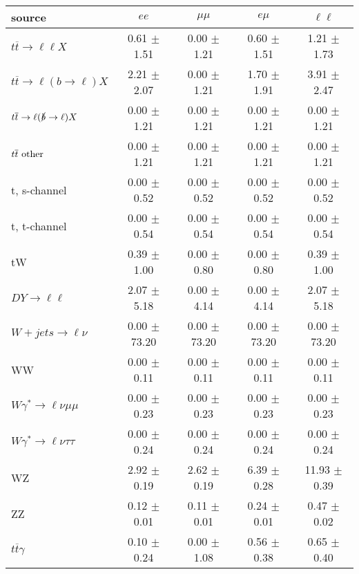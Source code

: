 \begin{tabular}{l|cccc} \hline\hline
source & $ee$ & $\mu\mu$ & $e\mu$ & $\ell\ell $ \\
\hline
$t\overline{t} \rightarrow \ell \ell X$ &  0.61 $\pm$  1.51 &  0.00 $\pm$  1.21 &  0.60 $\pm$  1.51 &  1.21 $\pm$  1.73 \\
$t\overline{t} \rightarrow \ell (b \rightarrow \ell) X$ &  2.21 $\pm$  2.07 &  0.00 $\pm$  1.21 &  1.70 $\pm$  1.91 &  3.91 $\pm$  2.47 \\
$t\overline{t} \rightarrow \ell (\slashed b \rightarrow \ell) X$ &  0.00 $\pm$  1.21 &  0.00 $\pm$  1.21 &  0.00 $\pm$  1.21 &  0.00 $\pm$  1.21 \\
        $t\overline{t}\ \rm{other}$ &  0.00 $\pm$  1.21 &  0.00 $\pm$  1.21 &  0.00 $\pm$  1.21 &  0.00 $\pm$  1.21 \\
\hline
                       t, s-channel &  0.00 $\pm$  0.52 &  0.00 $\pm$  0.52 &  0.00 $\pm$  0.52 &  0.00 $\pm$  0.52 \\
                       t, t-channel &  0.00 $\pm$  0.54 &  0.00 $\pm$  0.54 &  0.00 $\pm$  0.54 &  0.00 $\pm$  0.54 \\
                                 tW &  0.39 $\pm$  1.00 &  0.00 $\pm$  0.80 &  0.00 $\pm$  0.80 &  0.39 $\pm$  1.00 \\
\hline
         $DY \rightarrow \ell \ell$ &  2.07 $\pm$  5.18 &  0.00 $\pm$  4.14 &  0.00 $\pm$  4.14 &  2.07 $\pm$  5.18 \\
      $W+jets \rightarrow \ell \nu$ &  0.00 $\pm$ 73.20 &  0.00 $\pm$ 73.20 &  0.00 $\pm$ 73.20 &  0.00 $\pm$ 73.20 \\
                                 WW &  0.00 $\pm$  0.11 &  0.00 $\pm$  0.11 &  0.00 $\pm$  0.11 &  0.00 $\pm$  0.11 \\
\hline
$W\gamma^{*} \rightarrow \ell \nu \mu\mu$ &  0.00 $\pm$  0.23 &  0.00 $\pm$  0.23 &  0.00 $\pm$  0.23 &  0.00 $\pm$  0.23 \\
$W\gamma^{*} \rightarrow \ell \nu \tau\tau$ &  0.00 $\pm$  0.24 &  0.00 $\pm$  0.24 &  0.00 $\pm$  0.24 &  0.00 $\pm$  0.24 \\
                                 WZ &  2.92 $\pm$  0.19 &  2.62 $\pm$  0.19 &  6.39 $\pm$  0.28 & 11.93 $\pm$  0.39 \\
                                 ZZ &  0.12 $\pm$  0.01 &  0.11 $\pm$  0.01 &  0.24 $\pm$  0.01 &  0.47 $\pm$  0.02 \\
\hline
              $t\overline{t}\gamma$ &  0.10 $\pm$  0.24 &  0.00 $\pm$  1.08 &  0.56 $\pm$  0.38 &  0.65 $\pm$  0.40 \\

\end{tabular}
